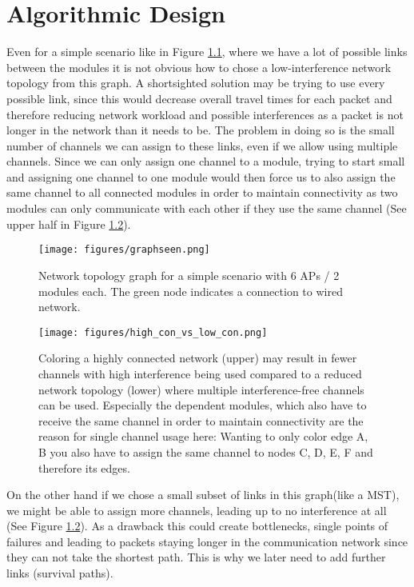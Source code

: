 \chapter{Algorithmic Design}
  Even for a simple scenario like in Figure \ref{fig:graphseen},
  where we have a lot of possible links between the modules it is not obvious how to chose a low-interference network topology from this graph.
  A shortsighted solution may be trying to use every possible link, 
  since this would decrease overall travel times for each packet and therefore reducing network workload and possible interferences as a packet is not longer in the network than it needs to be. 
  The problem in doing so is the small number of channels we can assign to these links, even if we allow using multiple channels.
  Since we can only assign one channel to a module, trying to start small and assigning one channel to one module would then force us to also 
  assign the same channel to all connected modules in order to maintain connectivity as two modules can only communicate with each other if they use the same channel
  (See upper half in Figure \ref{fig:high_con_vs_low_con}). 
  
  \begin{figure}[h!]
    \centering
    \texttt{[image: figures/graphseen.png]}
    \caption{Network topology graph for a simple scenario with 6 APs / 2 modules each. The green node indicates a connection to wired network.}
    \label{fig:graphseen}
  \end{figure}

  \begin{figure}[h!]
    \centering
    \texttt{[image: figures/high\_con\_vs\_low\_con.png]}
    \caption{Coloring a highly connected network (upper) may result in fewer channels with high interference being used compared to 
      a reduced network topology (lower) where multiple interference-free channels can be used.
      Especially the dependent modules, which also have to receive the same channel in order to maintain connectivity are the reason for single channel usage here: 
      Wanting to only color edge A, B you also have to assign the same channel to nodes C, D, E, F and therefore its edges.}
    \label{fig:high_con_vs_low_con}
  \end{figure}
  
  On the other hand if we chose a small subset of links in this graph(like a \ac{MST}), we might be able to assign more channels, 
  leading up to no interference at all (See Figure \ref{fig:high_con_vs_low_con}).
  As a drawback this could create bottlenecks, single points of failures and leading to packets staying longer in the 
  communication network since they can not take the shortest path.
  This is why we later need to add further links (survival paths).
  
